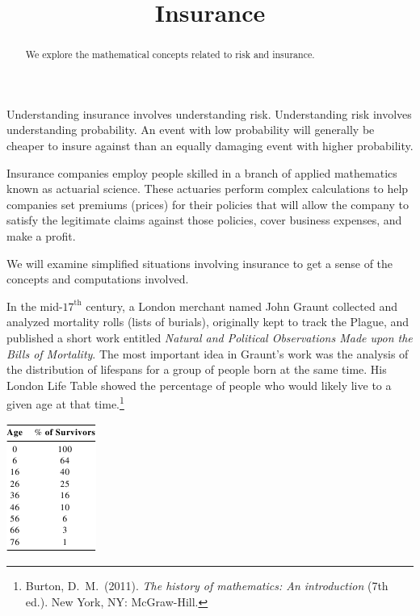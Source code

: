 \documentclass{ximera}
\title{Insurance}
\begin{document}
\begin{abstract}
We explore the mathematical concepts related to risk and insurance.
\end{abstract}

\maketitle

Understanding insurance involves understanding risk. Understanding risk involves understanding probability. An event with low probability will generally be cheaper to insure against than an equally damaging event with higher probability.

Insurance companies employ people skilled in a branch of applied mathematics known as actuarial science. These actuaries perform complex calculations to help companies set premiums (prices) for their policies that will allow the company to satisfy the legitimate claims against those policies, cover business expenses, and make a profit.

We will examine simplified situations involving insurance to get a sense of the concepts and computations involved.

In the mid-$17^\text{th}$ century, a London merchant named John Graunt collected and analyzed mortality rolls (lists of burials), originally kept to track the Plague, and published a short work entitled \textit{Natural and Political Observations Made upon the Bills of Mortality}. The most important idea in Graunt's work was the analysis of the distribution of lifespans for a group of people born at the same time. His London Life Table showed the percentage of people who would likely live to a given age at that time.\footnote{Burton, D.\ M.\ (2011). \textit{The history of mathematics: An introduction} (7th ed.). New York, NY: McGraw-Hill.}
\begin{image}
\includegraphics{InsuranceTable1.png}
\end{image}
\end{document}
